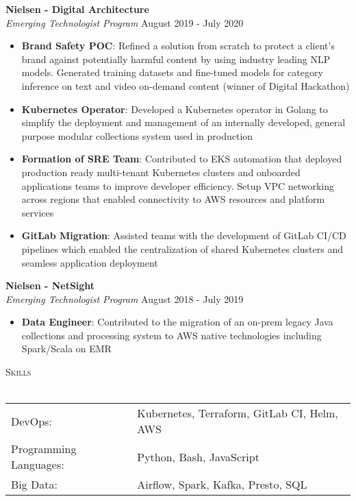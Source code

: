 \documentclass[a4paper]{article}
\newcommand{\lineunder} {
    \vspace*{-8pt} \\
    \hspace*{-18pt} \hrulefill \\
}
\newcommand{\header} [1] {
    {\hspace*{-18pt}\vspace*{6pt} \textsc{#1}}
    \vspace*{-6pt} \lineunder
}
\begin{document}
\textbf{Nielsen - Digital Architecture}\\
\textit{Emerging Technologist Program} \hfill August 2019 - July 2020\\
\vspace{-1mm}
\begin{itemize} \itemsep 1pt
	\item \textbf{Brand Safety POC}: Refined a solution from scratch to protect a client's brand against potentially harmful content by using industry leading NLP models. Generated training datasets and fine-tuned models for category inference on text and video on-demand content (winner of Digital Hackathon)
    \item \textbf{Kubernetes Operator}: Developed a Kubernetes operator in Golang to simplify the deployment and management of an internally developed, general purpose modular collections system used in production
    \item \textbf{Formation of SRE Team}: Contributed to EKS automation that deployed production ready multi-tenant Kubernetes clusters and onboarded applications teams to improve developer efficiency. Setup VPC networking across regions that enabled connectivity to AWS resources and platform services
    \item \textbf{GitLab Migration}: Assisted teams with the development of GitLab CI/CD pipelines which enabled the centralization of shared Kubernetes clusters and seamless application deployment
\end{itemize}

\textbf{Nielsen - NetSight}\\
\textit{Emerging Technologist Program} \hfill August 2018 - July 2019\\
\vspace{-1mm}
\begin{itemize} \itemsep 1pt
	\item \textbf{Data Engineer}: Contributed to the migration of an on-prem legacy Java collections and processing system to AWS native technologies including Spark/Scala on EMR
\end{itemize}

\header{Skills}
\vspace*{1mm}
\begin{tabular}{ l l }
	DevOps:                & Kubernetes, Terraform, GitLab CI, Helm, AWS                            \\
	Programming Languages: & Python, Bash, JavaScript                                               \\
	Big Data:              & Airflow, Spark, Kafka, Presto, SQL                                     \\
\end{tabular}
\vspace{3mm}
\end{document}
